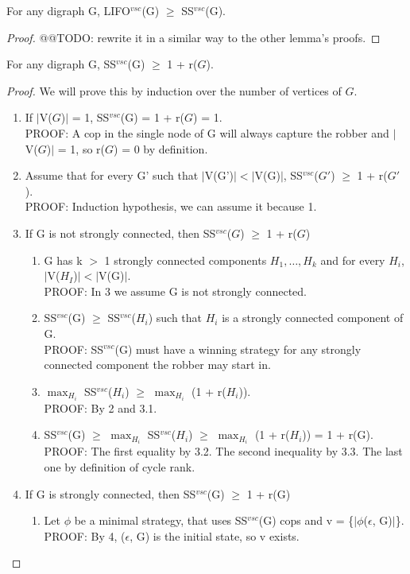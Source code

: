 \begin{lemma}
For any digraph G, LIFO$^{vsc}$(G) $\geq$ SS$^{vsc}$(G).
\end{lemma}
\begin{proof}
@@TODO: rewrite it in a similar way to the other lemma's proofs.
\end{proof}
\begin{lemma}
For any digraph G, SS$^{vsc}$(G) $\geq$ 1 + r($G$).
\end{lemma}
\begin{proof}
We will prove this by induction over the number of vertices of $G$.
\begin{enumerate}
  \item If $|$V($G$)$|$ = 1, SS$^{vsc}$(G) = 1 + r($G$) = 1. \\
  PROOF: A cop in the single node of G will always capture the robber and $|$V($G$)$|$ = 1, so r($G$) = 0 by definition.
  \item Assume that for every G' such that  $|$V(G')$| < |$V(G)$|$, SS$^{vsc}$($G'$) $\geq$ 1 + r($G'$). \\
  PROOF: Induction hypothesis, we can assume it because 1.
  \item If G is not strongly connected, then SS$^{vsc}$($G$) $\geq$ 1 + r($G$)
  \begin{enumerate}[label*=\arabic*.]
    \item G has k $>$ 1 strongly connected components $H_1, \ldots, H_k$ and for every $H_i$, $|$V($H_I$)$| < |$V(G)$|$. \\
    PROOF: In 3 we assume G is not strongly connected.
    
    \item SS$^{vsc}$(G) $\geq$ SS$^{vsc}$($H_i$) such that $H_i$ is a strongly connected component of G. \\
    PROOF: SS$^{vsc}$(G) must have a winning strategy for any strongly connected component the robber may start in.
    
    \item $\max_{H_i}$ SS$^{vsc}$($H_i$) $\geq$  $\max_{H_i}$ (1 + r($H_i$)). \\
    PROOF: By 2 and 3.1.
    
    \item SS$^{vsc}$(G) $\geq$ $\max_{H_i}$ SS$^{vsc}$($H_i$) $\geq$  $\max_{H_i}$ (1 + r($H_i$)) = 1 + r(G). \\
    PROOF: The first equality by 3.2. The second inequality by 3.3. The last one by definition of cycle rank.
  \end{enumerate}
  \item If G is strongly connected, then SS$^{vsc}$(G) $\geq$ 1 + r(G) 
  \begin{enumerate}[label*=\arabic*.]
    \item Let $\phi$ be a minimal strategy, that uses SS$^{vsc}$(G) cops and v = \{$|\phi$($\epsilon$, G)$|$\}. \\
    PROOF: By 4, ($\epsilon$, G) is the initial state, so v exists.
    

\end{enumerate}
\end{enumerate}
\end{proof}
